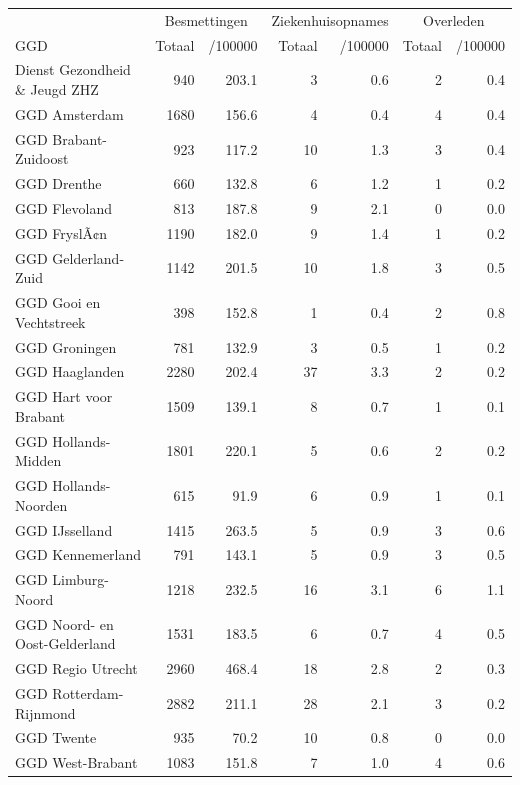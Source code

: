 \documentclass[
  english,
  man,floatsintext]{apa6}
\begin{document}
\begin{table}
\centering\begingroup\fontsize{10}{12}\selectfont

\begin{threeparttable}
\begin{tabular}{lrrrrrr}
\toprule
\multicolumn{1}{c}{ } & \multicolumn{2}{c}{Besmettingen} & \multicolumn{2}{c}{Ziekenhuisopnames} & \multicolumn{2}{c}{Overleden} \\
\cmidrule(l{3pt}r{3pt}){2-3} \cmidrule(l{3pt}r{3pt}){4-5} \cmidrule(l{3pt}r{3pt}){6-7}
GGD & Totaal & /100000 & Totaal & /100000 & Totaal & /100000\\
\midrule
Dienst Gezondheid \& Jeugd ZHZ & 940 & 203.1 & 3 & 0.6 & 2 & 0.4\\
GGD Amsterdam & 1680 & 156.6 & 4 & 0.4 & 4 & 0.4\\
GGD Brabant-Zuidoost & 923 & 117.2 & 10 & 1.3 & 3 & 0.4\\
GGD Drenthe & 660 & 132.8 & 6 & 1.2 & 1 & 0.2\\
GGD Flevoland & 813 & 187.8 & 9 & 2.1 & 0 & 0.0\\
GGD FryslÃ¢n & 1190 & 182.0 & 9 & 1.4 & 1 & 0.2\\
GGD Gelderland-Zuid & 1142 & 201.5 & 10 & 1.8 & 3 & 0.5\\
GGD Gooi en Vechtstreek & 398 & 152.8 & 1 & 0.4 & 2 & 0.8\\
GGD Groningen & 781 & 132.9 & 3 & 0.5 & 1 & 0.2\\
GGD Haaglanden & 2280 & 202.4 & 37 & 3.3 & 2 & 0.2\\
GGD Hart voor Brabant & 1509 & 139.1 & 8 & 0.7 & 1 & 0.1\\
GGD Hollands-Midden & 1801 & 220.1 & 5 & 0.6 & 2 & 0.2\\
GGD Hollands-Noorden & 615 & 91.9 & 6 & 0.9 & 1 & 0.1\\
GGD IJsselland & 1415 & 263.5 & 5 & 0.9 & 3 & 0.6\\
GGD Kennemerland & 791 & 143.1 & 5 & 0.9 & 3 & 0.5\\
GGD Limburg-Noord & 1218 & 232.5 & 16 & 3.1 & 6 & 1.1\\
GGD Noord- en Oost-Gelderland & 1531 & 183.5 & 6 & 0.7 & 4 & 0.5\\
GGD Regio Utrecht & 2960 & 468.4 & 18 & 2.8 & 2 & 0.3\\
GGD Rotterdam-Rijnmond & 2882 & 211.1 & 28 & 2.1 & 3 & 0.2\\
GGD Twente & 935 & 70.2 & 10 & 0.8 & 0 & 0.0\\
GGD West-Brabant & 1083 & 151.8 & 7 & 1.0 & 4 & 0.6\\

\end{tabular}
\end{threeparttable}
\end{table}
\end{document}
